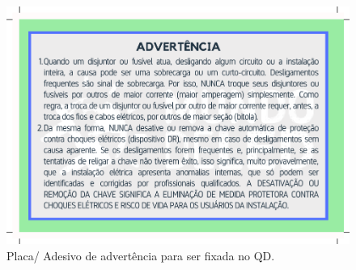\begin{figure}[ht]
    \centering
    \includegraphics[scale=0.5]{image/EtiqAdvQD.pdf}
    \caption{Placa/ Adesivo de advertência para ser fixada no QD.}
    \label{fig:advQD}
\end{figure}

